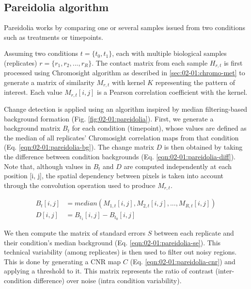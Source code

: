 \subsection{Pareidolia algorithm}

Pareidolia works by comparing one or several samples issued from two conditions such as treatments or timepoints.


Assuming two conditions $t=\{t_0, t_1\}$, each with multiple biological samples (replicates) $r=\{r_1, r_2, ..., r_R\}$. The contact matrix from each sample $H_{r, t}$ is first processed using Chromosight algorithm as described in \ref{sec:02-01:chromo-met} to generate a matrix of similarity $M_{r, t}$ with kernel $K$ representing the pattern of interest. Each value $M_{r, t}[i, j]$ is a Pearson correlation coefficient with the kernel.

Change detection is applied using an algorithm inspired by median filtering-based background formation \cite{ilseverTwoDimensionalChangeDetection2012} (Fig. \ref{fig:02-01:pareidolia}). First, we generate a background matrix $B_t$ for each condition (timepoint), whose values are defined as the median of all replicates' Chromosight correlation maps from that condition (Eq. \ref{eqn:02-01:pareidolia-bg}). The change matrix $D$ is then obtained by taking the difference between condition backgrounds (Eq. \ref{eqn:02-01:pareidolia-diff}). Note that, although values in $B_t$ and $D$ are computed independently at each position [i, j], the spatial dependency between pixels is taken into account through the convolution operation used to produce $M_{r, t}$.

\begin{align}
    \label{eqn:02-01:pareidolia-bg}
    B_t[i, j] &= median(M_{1, t}[i, j], M_{2, t}[i, j], ..., M_{R, t}[i, j]) \\
    \label{eqn:02-01:pareidolia-diff}
    D[i, j] &= B_{t_1}[i, j] - B_{t_0}[i, j]
\end{align}

We then compute the matrix of standard errors $S$ between each replicate and their condition's median background (Eq. \ref{eqn:02-01:pareidolia-se}). This technical variability (among replicates) is then used to filter out noisy regions. This is done by generating a \acrfull{CNR} map $C$ (Eq. \ref{eqn:02-01:pareidolia-cnr}) and applying a threshold to it. This matrix represents the ratio of contrast (inter-condition difference) over noise (intra condition variability).


